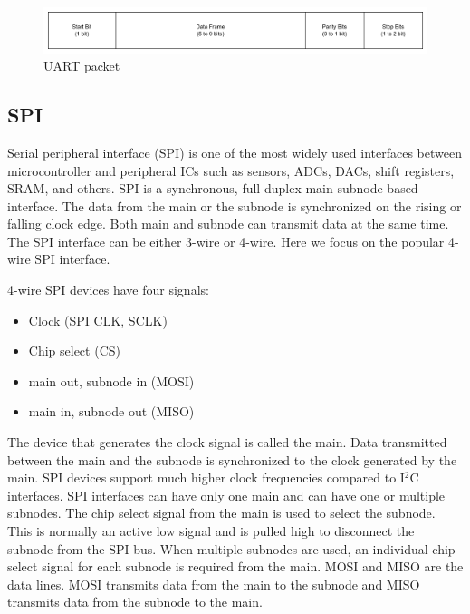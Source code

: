 \documentclass[a4paper,12pt]{report}
\begin{document}
\begin{figure}
  \begin{center}
    \includegraphics[clip, keepaspectratio, width=0.5\linewidth]{img/uart_packet.png}
    \caption{UART packet}
    \label{fig:uart_packet}
  \end{center}
\end{figure}

\subsection{SPI}

Serial peripheral interface (SPI)
is one of the most widely used interfaces between
microcontroller and peripheral ICs such as
sensors, ADCs, DACs, shift registers, SRAM, and others.
SPI is a synchronous, full duplex main-subnode-based interface.
The data from the main or the subnode is synchronized on the
rising or falling clock edge.
Both main and subnode can transmit data at the same time.
The SPI interface can be either 3-wire or 4-wire.
Here we focus on the popular 4-wire SPI interface.

4-wire SPI devices have four signals:

\begin{itemize}
  \item Clock (SPI CLK, SCLK)
  \item Chip select (CS)
  \item main out, subnode in (MOSI)
  \item main in, subnode out (MISO)
\end{itemize}

The device that generates the clock signal is called the main.
Data transmitted between the
main and the subnode is synchronized to the clock generated by the main.
SPI devices support much higher clock frequencies
compared to I$^2$C interfaces.
SPI interfaces can have only one main
and can have one or multiple subnodes.
The chip select signal from the main is used to select the subnode.
This is normally an active low signal and is pulled high
to disconnect the subnode from the SPI bus. When multiple subnodes are used,
an individual chip select signal for each subnode is required from the main.
MOSI and MISO are the data lines.
MOSI transmits data
from the main to the subnode and MISO transmits data
from the subnode to the main.
\end{document}
